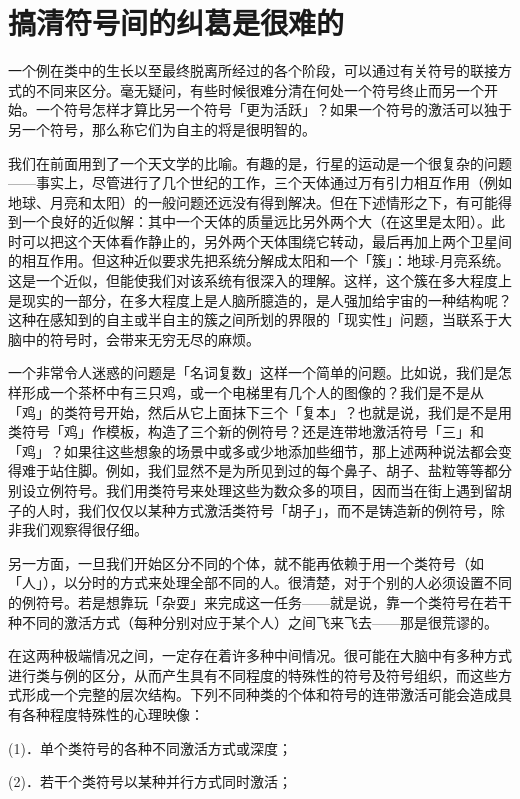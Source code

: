 \documentclass[
  12pt,
  twoside,
  openright,
  oldfontcommands,
]{memoir}
\begin{document}
\section{搞清符号间的纠葛是很难的}

一个例在类中的生长以至最终脱离所经过的各个阶段，可以通过有关符号的联接方式的不同来区分。毫无疑问，有些时候很难分清在何处一个符号终止而另一个开始。一个符号怎样才算比另一个符号「更为活跃」？如果一个符号的激活可以独于另一个符号，那么称它们为自主的将是很明智的。

我们在前面用到了一个天文学的比喻。有趣的是，行星的运动是一个很复杂的问题------事实上，尽管进行了几个世纪的工作，三个天体通过万有引力相互作用（例如地球、月亮和太阳）的一般问题还远没有得到解决。但在下述情形之下，有可能得到一个良好的近似解：其中一个天体的质量远比另外两个大（在这里是太阳）。此时可以把这个天体看作静止的，另外两个天体围绕它转动，最后再加上两个卫星间的相互作用。但这种近似要求先把系统分解成太阳和一个「簇」：地球-月亮系统。这是一个近似，但能使我们对该系统有很深入的理解。这样，这个簇在多大程度上是现实的一部分，在多大程度上是人脑所臆造的，是人强加给宇宙的一种结构呢？这种在感知到的自主或半自主的簇之间所划的界限的「现实性」问题，当联系于大脑中的符号时，会带来无穷无尽的麻烦。

一个非常令人迷惑的问题是「名词复数」这样一个简单的问题。比如说，我们是怎样形成一个茶杯中有三只鸡，或一个电梯里有几个人的图像的？我们是不是从「鸡」的类符号开始，然后从它上面抹下三个「复本」？也就是说，我们是不是用类符号「鸡」作模板，构造了三个新的例符号？还是连带地激活符号「三」和「鸡」？如果往这些想象的场景中或多或少地添加些细节，那上述两种说法都会变得难于站住脚。例如，我们显然不是为所见到过的每个鼻子、胡子、盐粒等等都分别设立例符号。我们用类符号来处理这些为数众多的项目，因而当在街上遇到留胡子的人时，我们仅仅以某种方式激活类符号「胡子」，而不是铸造新的例符号，除非我们观察得很仔细。

另一方面，一旦我们开始区分不同的个体，就不能再依赖于用一个类符号（如「人」），以分时的方式来处理全部不同的人。很清楚，对于个别的人必须设置不同的例符号。若是想靠玩「杂耍」来完成这一任务------就是说，靠一个类符号在若干种不同的激活方式（每种分别对应于某个人）之间飞来飞去------那是很荒谬的。

在这两种极端情况之间，一定存在着许多种中间情况。很可能在大脑中有多种方式进行类与例的区分，从而产生具有不同程度的特殊性的符号及符号组织，而这些方式形成一个完整的层次结构。下列不同种类的个体和符号的连带激活可能会造成具有各种程度特殊性的心理映像：

(1)．单个类符号的各种不同激活方式或深度；

(2)．若干个类符号以某种并行方式同时激活；
\end{document}
